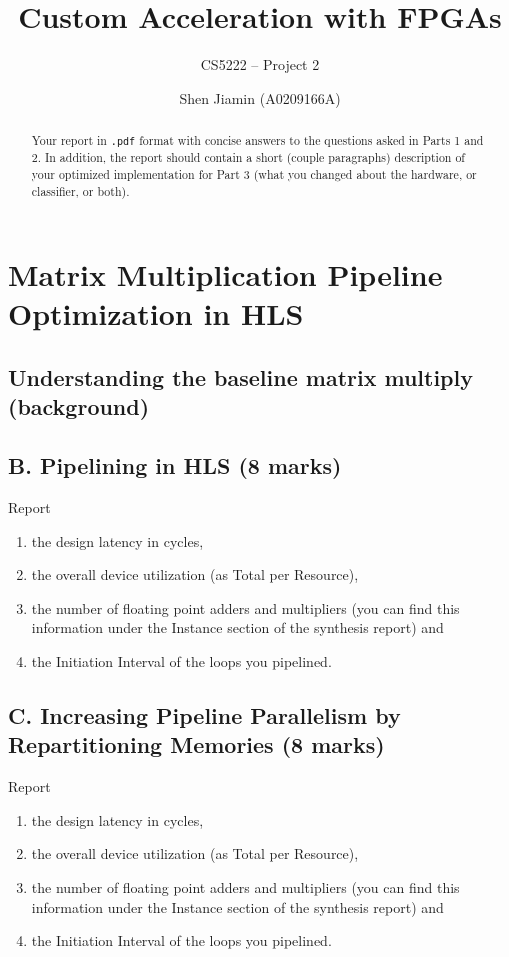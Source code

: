 \documentclass[screen,nonacm]{acmart}
\begin{document}
\title{
  Custom Acceleration with FPGAs
}
\subtitle{
  CS5222 -- Project 2
}

\author{Shen Jiamin (A0209166A)}


\begin{abstract}
  Your report in \texttt{.pdf} format with concise answers to the questions
  asked in Parts 1 and 2.
  In addition, the report should contain a short (couple paragraphs) description
  of your optimized implementation for Part 3 (what you changed about the
  hardware, or classifier, or both).
\end{abstract}

\maketitle

\section{Matrix Multiplication Pipeline Optimization in HLS}


\subsection{Understanding the baseline matrix multiply (background)}

\subsection{B. Pipelining in HLS (8 marks)}

Report
\begin{enumerate}
  \item the design latency in cycles,
  \item the overall device utilization (as Total per Resource),
  \item the number of floating point adders and multipliers (you can find this information under the Instance section of the synthesis report) and
  \item the Initiation Interval of the loops you pipelined.
\end{enumerate}

\subsection{C. Increasing Pipeline Parallelism by Repartitioning Memories (8 marks)}

Report
\begin{enumerate}
  \item the design latency in cycles,
  \item the overall device utilization (as Total per Resource),
  \item the number of floating point adders and multipliers (you can find this information under the Instance section of the synthesis report) and
  \item the Initiation Interval of the loops you pipelined.
\end{enumerate}
\end{document}
